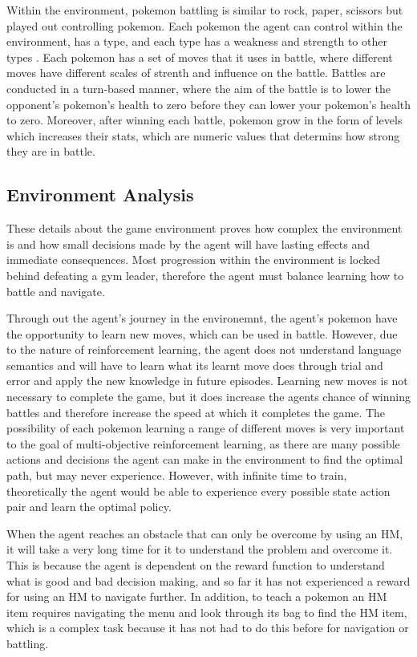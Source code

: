 Within the environment, pokemon battling is similar to rock, paper, scissors but played out controlling pokemon. Each pokemon the agent can control within the environment, has a type, and each type has a weakness and strength to other types \cite{SerebiiTeam2016}. Each pokemon has a set of moves that it uses in battle, where different moves have different scales of strenth and influence on the battle. Battles are conducted in a turn-based manner, where the aim of the battle is to lower the opponent's pokemon's health to zero before they can lower your pokemon's health to zero. Moreover, after winning each battle, pokemon grow in the form of levels which increases their stats, which are numeric values that determins how strong they are in battle. 


\subsection{Environment Analysis}

These details about the game environment proves how complex the environment is and how small decisions made by the agent will have lasting effects and immediate consequences. Most progression within the environment is locked behind defeating a gym leader, therefore the agent must balance learning how to battle and navigate. 

Through out the agent's journey in the environemnt, the agent's pokemon have the opportunity to learn new moves, which can be used in battle. However, due to the nature of reinforcement learning, the agent does not understand language semantics and will have to learn what its learnt move does through trial and error and apply the new knowledge in future episodes. Learning new moves is not necessary to complete the game, but it does increase the agents chance of winning battles and therefore increase the speed at which it completes the game. The possibility of each pokemon learning a range of different moves is very important to the goal of multi-objective reinforcement learning, as there are many possible actions and decisions the agent can make in the environment to find the optimal path, but may never experience. However, with infinite time to train, theoretically the agent would be able to experience every possible state action pair and learn the optimal policy. 

When the agent reaches an obstacle that can only be overcome by using an HM, it will take a very long time for it to understand the problem and overcome it. This is because the agent is dependent on the reward function to understand what is good and bad decision making, and so far it has not experienced a reward for using an HM to navigate further. In addition, to teach a pokemon an HM item requires navigating the menu and look through its bag to find the HM item, which is a complex task because it has not had to do this before for navigation or battling.

